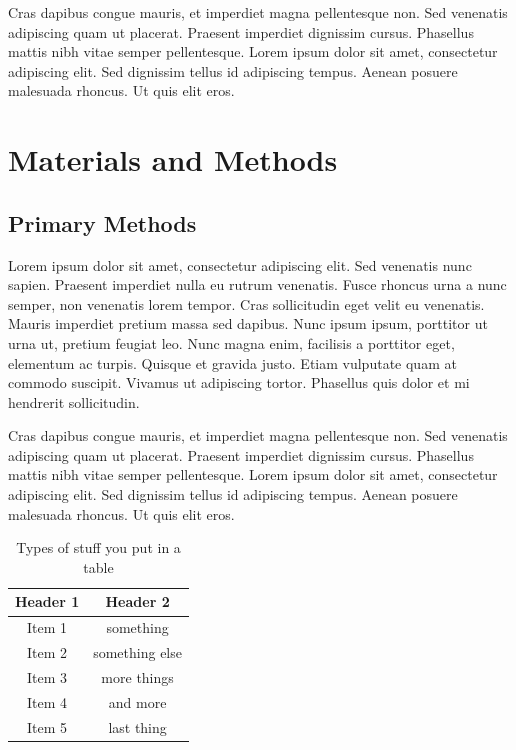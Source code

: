 \documentclass[double,12pt]{beavtex}
\begin{document}
Cras dapibus congue mauris, et imperdiet magna pellentesque non. Sed venenatis adipiscing quam ut placerat. Praesent imperdiet dignissim cursus. Phasellus mattis nibh vitae semper pellentesque. Lorem ipsum dolor sit amet, consectetur adipiscing elit. Sed dignissim tellus id adipiscing tempus. Aenean posuere malesuada rhoncus. Ut quis elit eros.




\chapter{Materials and Methods}

\section{Primary Methods}

Lorem ipsum dolor sit amet, consectetur adipiscing elit. Sed venenatis nunc sapien. Praesent imperdiet nulla eu rutrum venenatis. Fusce rhoncus urna a nunc semper, non venenatis lorem tempor. Cras sollicitudin eget velit eu venenatis. Mauris imperdiet pretium massa sed dapibus. Nunc ipsum ipsum, porttitor ut urna ut, pretium feugiat leo. Nunc magna enim, facilisis a porttitor eget, elementum ac turpis. Quisque et gravida justo. Etiam vulputate quam at commodo suscipit. Vivamus ut adipiscing tortor. Phasellus quis dolor et mi hendrerit sollicitudin. 

Cras dapibus congue mauris, et imperdiet magna pellentesque non. Sed venenatis adipiscing quam ut placerat. Praesent imperdiet dignissim cursus. Phasellus mattis nibh vitae semper pellentesque. Lorem ipsum dolor sit amet, consectetur adipiscing elit. Sed dignissim tellus id adipiscing tempus. Aenean posuere malesuada rhoncus. Ut quis elit eros.


\begin{table}[ht]
\caption{Types of stuff you put in a table} %
\centering  %
\begin{tabular}{c c} %
\hline\hline                        %
Header 1 & Header 2 \\ [0.5ex] %
\hline                  %
Item 1 & something  \\ %
Item 2 & something else  \\
Item 3 & more things  \\
Item 4 & and more \\
Item 5 & last thing \\ [1ex]      %
\hline %
\end{tabular}
\label{table:misc} %
\end{table}
\end{document}
